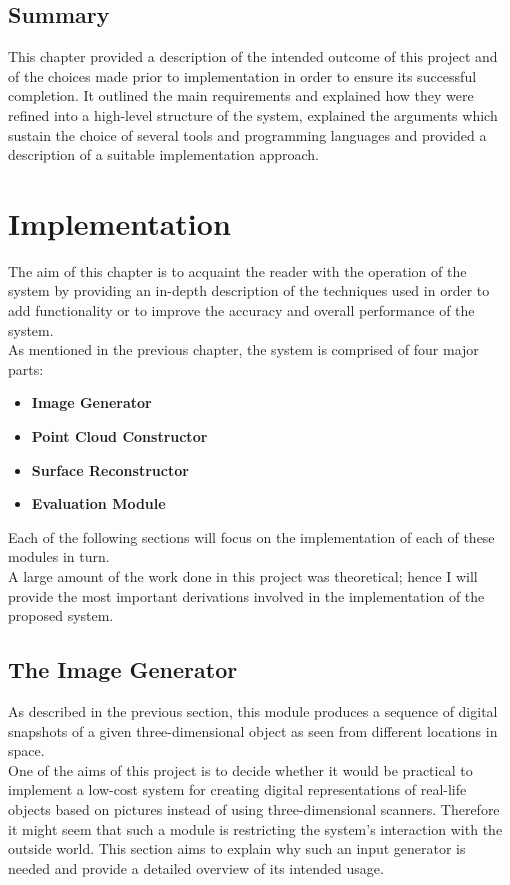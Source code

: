 \documentclass[12pt,a4paper,twoside,openright]{report}
\begin{document}
\section{Summary}
This chapter provided a description of the intended outcome of this project and of the choices made prior to implementation in order to ensure its successful completion. It outlined the main requirements and explained how they were refined into a high-level structure of the system, explained the arguments which sustain the choice of several tools and programming languages and provided a description of a suitable implementation approach.
\chapter{Implementation}

The aim of this chapter is to acquaint the reader with the operation of the system by providing an in-depth description of the techniques used in order to add functionality or to improve the accuracy and overall performance of the system.\\
\linebreak
As mentioned in the previous chapter, the system is comprised of four major parts:
\begin{itemize}
\item \textbf{Image Generator}
\item \textbf{Point Cloud Constructor} 
\item \textbf{Surface Reconstructor}
\item \textbf{Evaluation Module}
\end{itemize}
Each of the following sections will focus on the implementation of each of these modules in turn.\\
\linebreak
A large amount of the work done in this project was theoretical; hence I will provide the most important derivations involved in the implementation of the proposed system. 

\section{The Image Generator}
As described in the previous section, this module produces a sequence of digital snapshots of a given three-dimensional object as seen from different locations in space. \\
One of the aims of this project is to decide whether it would be practical to implement a low-cost system for creating digital representations of real-life objects based on pictures instead of using three-dimensional scanners. Therefore it might seem that such a module is restricting the system's interaction with the outside world. This section aims to explain why such an input generator is needed and provide a detailed overview of its intended usage. 
\end{document}
